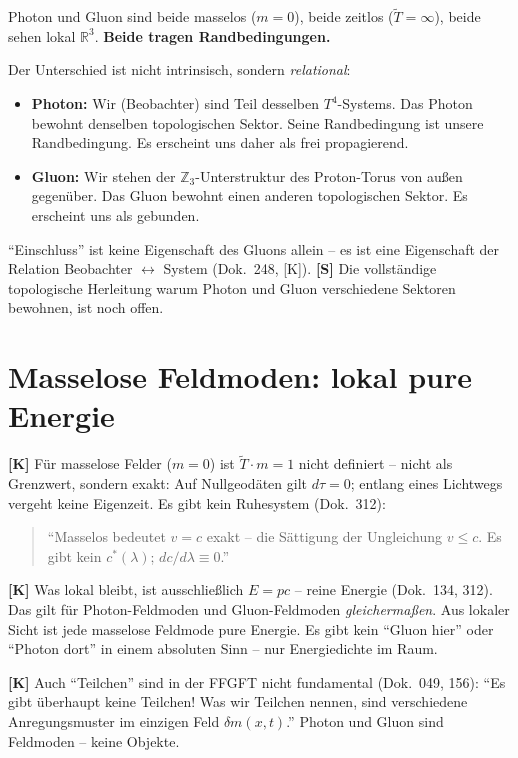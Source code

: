 \begin{keyresult}
Photon und Gluon sind beide masselos ($m=0$), beide zeitlos
($\tilde{T}=\infty$), beide sehen lokal $\mathbb{R}^3$.
\textbf{Beide tragen Randbedingungen.}

Der Unterschied ist nicht intrinsisch, sondern \emph{relational}:
\begin{itemize}
  \item \textbf{Photon:} Wir (Beobachter) sind Teil desselben
    $T^4$-Systems. Das Photon bewohnt denselben topologischen Sektor.
    Seine Randbedingung ist unsere Randbedingung. Es erscheint uns
    daher als frei propagierend.
  \item \textbf{Gluon:} Wir stehen der $\mathbb{Z}_3$-Unterstruktur
    des Proton-Torus von außen gegenüber. Das Gluon bewohnt einen
    anderen topologischen Sektor. Es erscheint uns als gebunden.
\end{itemize}
``Einschluss'' ist keine Eigenschaft des Gluons allein -- es ist
eine Eigenschaft der Relation Beobachter $\leftrightarrow$ System
(Dok.~248, [K]). \textbf{[S]} Die vollständige topologische Herleitung
warum Photon und Gluon verschiedene Sektoren bewohnen, ist noch offen.
\end{keyresult}

\section{Masselose Feldmoden: lokal pure Energie}

\textbf{[K]} Für masselose Felder ($m=0$) ist $\tilde{T}\cdot m=1$
nicht definiert -- nicht als Grenzwert, sondern exakt: Auf
Nullgeodäten gilt $d\tau = 0$; entlang eines Lichtwegs vergeht
keine Eigenzeit. Es gibt kein Ruhesystem (Dok.~312):
\begin{quote}
``Masselos bedeutet $v=c$ exakt -- die Sättigung der Ungleichung
$v\le c$. Es gibt kein $c^*(\lambda)$; $dc/d\lambda\equiv 0$.''
\end{quote}

\textbf{[K]} Was lokal bleibt, ist ausschließlich $E = pc$ -- reine
Energie (Dok.~134, 312). Das gilt für Photon-Feldmoden und
Gluon-Feldmoden \emph{gleichermaßen}. Aus lokaler Sicht ist jede
masselose Feldmode pure Energie. Es gibt kein ``Gluon hier'' oder
``Photon dort'' in einem absoluten Sinn -- nur Energiedichte im Raum.

\textbf{[K]} Auch ``Teilchen'' sind in der FFGFT nicht fundamental
(Dok.~049, 156): ``Es gibt überhaupt keine Teilchen! Was wir Teilchen
nennen, sind verschiedene Anregungsmuster im einzigen Feld
$\delta m(x,t)$.'' Photon und Gluon sind Feldmoden -- keine Objekte.

